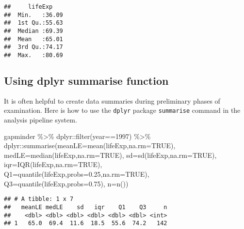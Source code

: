 \documentclass[
]{book}
\newenvironment{Shaded}{\begin{snugshade}}{\end{snugshade}}
\newcommand{\AttributeTok}[1]{\textcolor[rgb]{0.77,0.63,0.00}{#1}}
\newcommand{\ConstantTok}[1]{\textcolor[rgb]{0.00,0.00,0.00}{#1}}
\newcommand{\DecValTok}[1]{\textcolor[rgb]{0.00,0.00,0.81}{#1}}
\newcommand{\FloatTok}[1]{\textcolor[rgb]{0.00,0.00,0.81}{#1}}
\newcommand{\FunctionTok}[1]{\textcolor[rgb]{0.00,0.00,0.00}{#1}}
\newcommand{\NormalTok}[1]{#1}
\newcommand{\SpecialCharTok}[1]{\textcolor[rgb]{0.00,0.00,0.00}{#1}}
\begin{document}
\begin{verbatim}
##     lifeExp     
##  Min.   :36.09  
##  1st Qu.:55.63  
##  Median :69.39  
##  Mean   :65.01  
##  3rd Qu.:74.17  
##  Max.   :80.69
\end{verbatim}

\hypertarget{using-dplyr-summarise-function}{%
\subsection{Using dplyr summarise function}\label{using-dplyr-summarise-function}}

It is often helpful to create data summaries during preliminary phases of examination. Here is how to use the \texttt{dplyr} package \texttt{summarise} command in the analysis pipeline system.

\begin{Shaded}
\begin{Highlighting}[]
\NormalTok{gapminder }\SpecialCharTok{\%\textgreater{}\%}\NormalTok{ dplyr}\SpecialCharTok{::}\FunctionTok{filter}\NormalTok{(year}\SpecialCharTok{==}\DecValTok{1997}\NormalTok{) }\SpecialCharTok{\%\textgreater{}\%} 
\NormalTok{      dplyr}\SpecialCharTok{::}\FunctionTok{summarise}\NormalTok{(}\AttributeTok{meanLE=}\FunctionTok{mean}\NormalTok{(lifeExp,}\AttributeTok{na.rm=}\ConstantTok{TRUE}\NormalTok{),}
                       \AttributeTok{medLE=}\FunctionTok{median}\NormalTok{(lifeExp,}\AttributeTok{na.rm=}\ConstantTok{TRUE}\NormalTok{),}
                       \AttributeTok{sd=}\FunctionTok{sd}\NormalTok{(lifeExp,}\AttributeTok{na.rm=}\ConstantTok{TRUE}\NormalTok{),}
                       \AttributeTok{iqr=}\FunctionTok{IQR}\NormalTok{(lifeExp,}\AttributeTok{na.rm=}\ConstantTok{TRUE}\NormalTok{),}
                      \AttributeTok{Q1=}\FunctionTok{quantile}\NormalTok{(lifeExp,}\AttributeTok{probs=}\FloatTok{0.25}\NormalTok{,}\AttributeTok{na.rm=}\ConstantTok{TRUE}\NormalTok{),}
                      \AttributeTok{Q3=}\FunctionTok{quantile}\NormalTok{(lifeExp,}\AttributeTok{probs=}\FloatTok{0.75}\NormalTok{),}
                      \AttributeTok{n=}\FunctionTok{n}\NormalTok{())}
\end{Highlighting}
\end{Shaded}

\begin{verbatim}
## # A tibble: 1 x 7
##   meanLE medLE    sd   iqr    Q1    Q3     n
##    <dbl> <dbl> <dbl> <dbl> <dbl> <dbl> <int>
## 1   65.0  69.4  11.6  18.5  55.6  74.2   142
\end{verbatim}
\end{document}
